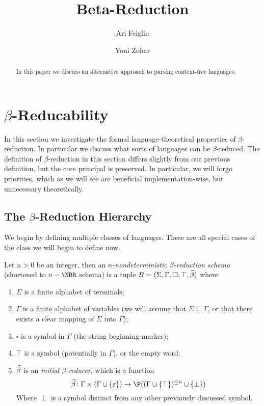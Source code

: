 \documentclass{llncs}
\begin{document}
\title{Beta-Reduction}
\author{Ari Feiglin\and Yoni Zohar}

\maketitle

\begin{abstract}

    In this paper we discuss an alternative approach to parsing context-free languages.

\end{abstract}

\section{$\beta$-Reducability}

In this section we investigate the formal language-theoretical properties of $\beta$-reduction.
In particular we discuss what sorts of languages can be $\beta$-reduced.
The definition of $\beta$-reduction in this section differs slightly from our previous definition, but the core principal
is preserved.
In particular, we will forgo priorities, which as we will see are beneficial implementation-wise, but unnecessary theoretically.

\subsection{The $\beta$-Reduction Hierarchy}

We begin by defining multiple classes of languages.
These are all special cases of the class we will begin to define now.

\begin{definition}

    Let $n>0$ be an integer, then an \emph{$n$-nondeterministic $\beta$-reduction schema} (shortened to $n-\NBR$ schema) is
    a tuple $B=(\Sigma,\Gamma,\square,\top,\widehat\beta)$ where
    \begin{enumerate}
        \item $\Sigma$ is a finite alphabet of terminals;
        \item $\Gamma$ is a finite alphabet of variables (we will assume that $\Sigma\subseteq\Gamma$, or that there exists a
            clear mapping of $\Sigma$ into $\Gamma$);
        \item $\square$ is a symbol in $\Gamma$ (the string beginning-marker);
        \item $\top$ is a symbol (potentially in $\Gamma$), or the empty word;
        \item $\widehat\beta$ is an \emph{initial $\beta$-reducer}, which is a function
        $$ \hb\colon\Gamma\times(\Gamma\cup\set\epsilon)\to\P((\Gamma\cup\set{\top})^{\leq n}\cup\set\perp) $$
            Where $\perp$ is a symbol distinct from any other previously discussed symbol.
    \end{enumerate}

\end{definition}
\end{document}
